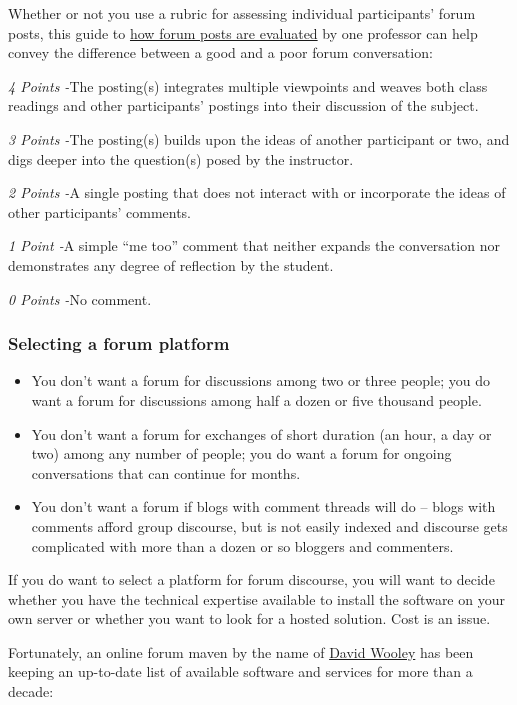 Whether or not you use a rubric for assessing individual participants'
forum posts, this guide to
\href{http://www.wpi.edu/Academics/ATC/Collaboratory/Idea/boards.html}{how
forum posts are evaluated} by one professor can help convey the
difference between a good and a poor forum conversation:

\emph{4 Points -}The posting(s) integrates multiple viewpoints and
weaves both class readings and other participants' postings into their
discussion of the subject.

\emph{3 Points -}The posting(s) builds upon the ideas of another
participant or two, and digs deeper into the question(s) posed by the
instructor.

\emph{2 Points -}A single posting that does not interact with or
incorporate the ideas of other participants' comments.

\emph{1 Point -}A simple ``me too'' comment that neither expands the
conversation nor demonstrates any degree of reflection by the student.

\emph{0 Points -}No comment.

\subsubsection{Selecting a forum platform}

\begin{itemize}
\itemsep1pt\parskip0pt
\item
  You don't want a forum for discussions among two or three people; you
  do want a forum for discussions among half a dozen or five thousand
  people.
\item
  You don't want a forum for exchanges of short duration (an hour, a day
  or two) among any number of people; you do want a forum for ongoing
  conversations that can continue for months.
\item
  You don't want a forum if blogs with comment threads will do -- blogs
  with comments afford group discourse, but is not easily indexed and
  discourse gets complicated with more than a dozen or so bloggers and
  commenters.
\end{itemize}

If you do want to select a platform for forum discourse, you will want
to decide whether you have the technical expertise available to install
the software on your own server or whether you want to look for a hosted
solution. Cost is an issue.

Fortunately, an online forum maven by the name of
\href{http://thinkofit.com/whoweare.htm}{David Wooley} has been keeping
an up-to-date list of available software and services for more than a
decade:


